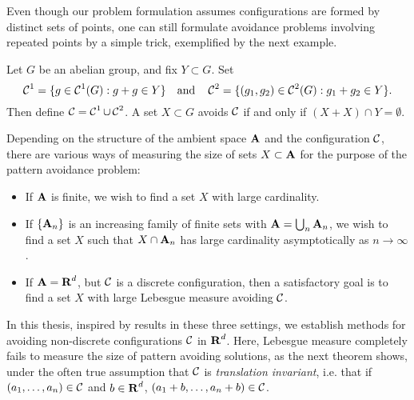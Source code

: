 
Even though our problem formulation assumes configurations are formed by distinct sets of points, one can still formulate avoidance problems involving repeated points by a simple trick, exemplified by the next example.

\begin{example}
	Let $G$ be an abelian group, and fix $Y \subset G$. Set
	\[ \operatorname{\mathcal{C}}^1 = \{ g \in \operatorname{\mathcal{C}}^1(G): g + g \in Y \} \quad \text{and} \quad \operatorname{\mathcal{C}}^2 = \{ (g_1,g_2) \in \operatorname{\mathcal{C}}^2(G): g_1 + g_2 \in Y \}. \]
	Then define $\operatorname{\mathcal{C}} = \operatorname{\mathcal{C}}^1 \cup \operatorname{\mathcal{C}}^2$. A set $X \subset G$ avoids $\operatorname{\mathcal{C}}$ if and only if $(X + X) \cap Y = \emptyset$.
\end{example}

Depending on the structure of the ambient space $\operatorname{\mathbf{A}}$ and the configuration $\operatorname{\mathcal{C}}$, there are various ways of measuring the size of sets $X \subset \operatorname{\mathbf{A}}$ for the purpose of the pattern avoidance problem:
%
\begin{itemize}
	\item If $\operatorname{\mathbf{A}}$ is finite, we wish to find a set $X$ with large cardinality.
	\item If $\{ \operatorname{\mathbf{A}}_n \}$ is an increasing family of finite sets with $\operatorname{\mathbf{A}} = \bigcup_n \operatorname{\mathbf{A}}_n$, we wish to find a set $X$ such that $X \cap \operatorname{\mathbf{A}}_n$ has large cardinality asymptotically as $n \to \infty$.
	\item If $\operatorname{\mathbf{A}} = \operatorname{\mathbf{R}}^d$, but $\operatorname{\mathcal{C}}$ is a discrete configuration, then a satisfactory goal is to find a set $X$ with large Lebesgue measure avoiding $\operatorname{\mathcal{C}}$.
\end{itemize}
%
In this thesis, inspired by results in these three settings, we establish methods for avoiding non-discrete configurations $\operatorname{\mathcal{C}}$ in $\operatorname{\mathbf{R}}^d$. Here, Lebesgue measure completely fails to measure the size of pattern avoiding solutions, as the next theorem shows, under the often true assumption that $\operatorname{\mathcal{C}}$ is \emph{translation invariant}, i.e. that if $(a_1, \dots, a_n) \in \operatorname{\mathcal{C}}$ and $b \in \operatorname{\mathbf{R}}^d$, $(a_1 + b, \dots, a_n + b) \in \operatorname{\mathcal{C}}$.

